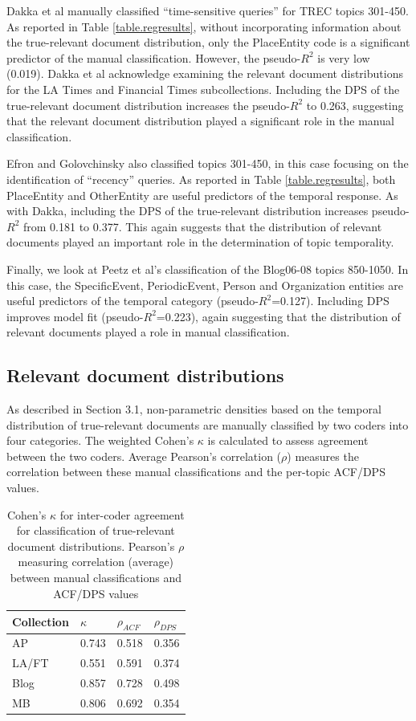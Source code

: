 \documentclass{sig-alternate}
\begin{document}
Dakka et al manually classified ``time-sensitive queries'' for TREC topics 301-450. As reported in Table \ref{table.regresults}, without incorporating information about the true-relevant document distribution, only the PlaceEntity code is a significant predictor of the manual classification. However, the pseudo-$R^2$ is very low (0.019).  Dakka et al acknowledge examining the relevant document distributions for the LA Times and Financial Times subcollections.  Including the DPS of the true-relevant document distribution increases the pseudo-$R^2$ to 0.263, suggesting that the relevant document distribution played a significant role in the manual classification.

Efron and Golovchinsky also classified topics 301-450, in this case focusing on the identification of ``recency'' queries. As reported in Table \ref{table.regresults}, both PlaceEntity and OtherEntity are useful predictors of the temporal response. As with Dakka, including the DPS of the true-relevant distribution increases pseudo-$R^2$ from 0.181 to 0.377. This again suggests that the distribution of relevant documents played an important role in the determination of topic temporality.

Finally, we look at Peetz et al's classification of the Blog06-08 topics 850-1050. In this case, the SpecificEvent, PeriodicEvent, Person and Organization entities are useful predictors of the temporal category (pseudo-$R^2$=0.127). Including DPS  improves model fit (pseudo-$R^2$=0.223), again suggesting that the distribution of relevant documents played a role in manual classification.

\subsection{Relevant document distributions}

As described in Section 3.1, non-parametric densities based on the temporal distribution of true-relevant documents are manually classified by two coders into four categories.  The weighted Cohen's $\kappa$ is calculated to assess agreement between the two coders.  Average Pearson's correlation ($\rho$) measures the correlation between these manual classifications and the per-topic ACF/DPS values.  

\begin{table}
\centering
\begin{tabular}{| l | l | l | l | } \hline
\bf{Collection} & \bf{$\kappa$}  & \bf{$\rho_{ACF}$} & \bf{$\rho_{DPS}$} \\ \hline
AP 	   & 0.743 & 0.518 & 0.356 \\ \hline
LA/FT & 0.551 & 0.591 & 0.374 \\ \hline
Blog    & 0.857 & 0.728 & 0.498 \\ \hline
MB      & 0.806 & 0.692 & 0.354 \\ \hline 
\end{tabular}
\caption{Cohen's $\kappa$ for inter-coder agreement for classification of true-relevant document distributions. Pearson's $\rho$ measuring correlation (average) between manual classifications and ACF/DPS values}
\label{table.cor}
\end{table}
\end{document}
